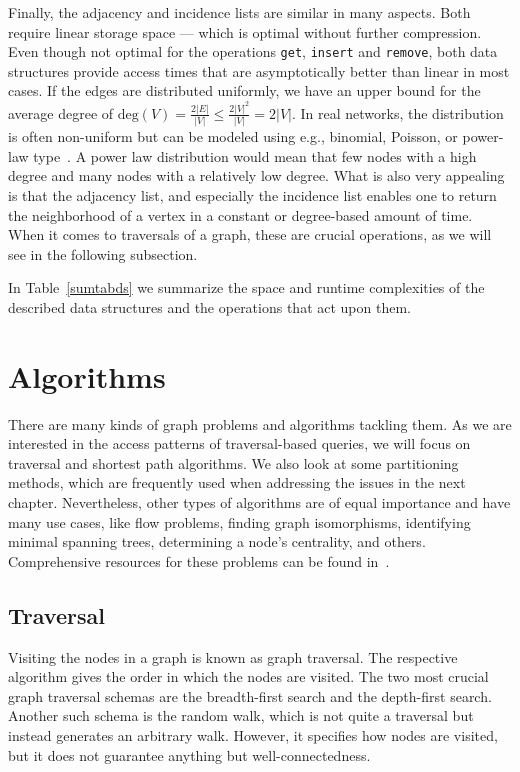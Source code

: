             
            Finally, the adjacency and incidence lists are similar in many aspects. Both require linear storage space --- which is optimal without further compression. 
            Even though not optimal for the operations \texttt{get}, \texttt{insert} and \texttt{remove}, both data structures provide access times that are asymptotically better than linear in most cases.
            If the edges are distributed uniformly, we have an upper bound for the average degree of $\text{deg}(V) = \frac{2|E|}{|V|} \leq \frac{2 |V|^2}{|V|} = 2 |V|$.
            In real networks, the distribution is often non-uniform but can be modeled using e.g., binomial, Poisson, or power-law type~\autocite{holme2019rare}. 
            A power law distribution would mean that few nodes with a high degree and many nodes with a relatively low degree. 
            What is also very appealing is that the adjacency list, and especially the incidence list enables one to return the neighborhood of a vertex in a constant or degree-based amount of time. 
            When it comes to traversals of a graph, these are crucial operations, as we will see in the following subsection. 
            
            In Table~\ref{sumtabds} we summarize the space and runtime complexities of the described data structures and the operations that act upon them. 
            


    \newpage
    \section{Algorithms}\label{queries}
        There are many kinds of graph problems and algorithms tackling them. 
        As we are interested in the access patterns of traversal-based queries, we will focus on traversal and shortest path algorithms. 
        We also look at some partitioning methods, which are frequently used when addressing the issues in the next chapter.
        Nevertheless, other types of algorithms are of equal importance and have many use cases, like flow problems, finding graph isomorphisms, identifying minimal spanning trees, determining a node's centrality, and others.
        Comprehensive resources for these problems can be found in~\autocite{steger2007diskrete, Gross1998GraphTA, aho1974design, cormen2009introduction, Goodrich2014AlgorithmDA}.
        
        \subsection{Traversal}
            Visiting the nodes in a graph is known as graph traversal. 
            The respective algorithm gives the order in which the nodes are visited. 
            The two most crucial graph traversal schemas are the breadth-first search and the depth-first search. 
            Another such schema is the random walk, which is not quite a traversal but instead generates an arbitrary walk. 
            However, it specifies how nodes are visited, but it does not guarantee anything but well-connectedness.
            
